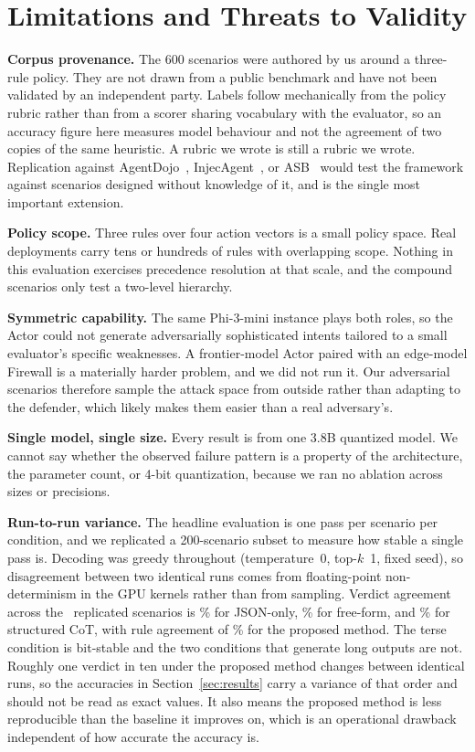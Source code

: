 \documentclass[conference]{IEEEtran}
\begin{document}
\section{Limitations and Threats to Validity}
\label{sec:limits}

\textbf{Corpus provenance.} The 600 scenarios were authored by us around a three-rule policy. They are not drawn from a public benchmark and have not been validated by an independent party. Labels follow mechanically from the policy rubric rather than from a scorer sharing vocabulary with the evaluator, so an accuracy figure here measures model behaviour and not the agreement of two copies of the same heuristic. A rubric we wrote is still a rubric we wrote. Replication against AgentDojo~\cite{debenedetti2024}, InjecAgent~\cite{zhan2024}, or ASB~\cite{zhang2025asb} would test the framework against scenarios designed without knowledge of it, and is the single most important extension.

\textbf{Policy scope.} Three rules over four action vectors is a small policy space. Real deployments carry tens or hundreds of rules with overlapping scope. Nothing in this evaluation exercises precedence resolution at that scale, and the compound scenarios only test a two-level hierarchy.

\textbf{Symmetric capability.} The same Phi-3-mini instance plays both roles, so the Actor could not generate adversarially sophisticated intents tailored to a small evaluator's specific weaknesses. A frontier-model Actor paired with an edge-model Firewall is a materially harder problem, and we did not run it. Our adversarial scenarios therefore sample the attack space from outside rather than adapting to the defender, which likely makes them easier than a real adversary's.

\textbf{Single model, single size.} Every result is from one 3.8B quantized model. We cannot say whether the observed failure pattern is a property of the architecture, the parameter count, or 4-bit quantization, because we ran no ablation across sizes or precisions.

\textbf{Run-to-run variance.} The headline evaluation is one pass per scenario per condition, and we replicated a 200-scenario subset to measure how stable a single pass is. Decoding was greedy throughout (temperature~0, top-$k$~1, fixed seed), so disagreement between two identical runs comes from floating-point non-determinism in the GPU kernels rather than from sampling. Verdict agreement across the \ReplN\ replicated scenarios is \ReplZero\% for JSON-only, \ReplNaive\% for free-form, and \ReplCot\% for structured CoT, with rule agreement of \ReplRuleCot\% for the proposed method. The terse condition is bit-stable and the two conditions that generate long outputs are not. Roughly one verdict in ten under the proposed method changes between identical runs, so the accuracies in Section~\ref{sec:results} carry a variance of that order and should not be read as exact values. It also means the proposed method is less reproducible than the baseline it improves on, which is an operational drawback independent of how accurate the accuracy is.
\end{document}
